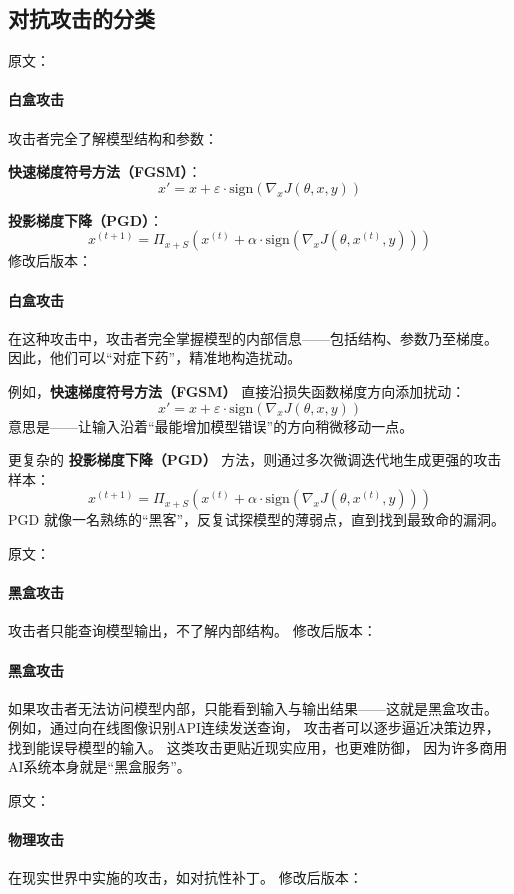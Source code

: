 \subsection{对抗攻击的分类}

原文：
\paragraph{白盒攻击}
攻击者完全了解模型结构和参数：

\textbf{快速梯度符号方法（FGSM）}：
$$x' = x + \varepsilon \cdot \text{sign}(\nabla_x J(\theta, x, y))$$

\textbf{投影梯度下降（PGD）}：
$$x^{(t+1)} = \Pi_{x+S}(x^{(t)} + \alpha \cdot \text{sign}(\nabla_x J(\theta, x^{(t)}, y)))$$
修改后版本：
\paragraph{白盒攻击}  
在这种攻击中，攻击者完全掌握模型的内部信息——包括结构、参数乃至梯度。  
因此，他们可以“对症下药”，精准地构造扰动。  

例如，\textbf{快速梯度符号方法（FGSM）} 直接沿损失函数梯度方向添加扰动：  
$$x' = x + \varepsilon \cdot \text{sign}(\nabla_x J(\theta, x, y))$$  
意思是——让输入沿着“最能增加模型错误”的方向稍微移动一点。  

更复杂的 \textbf{投影梯度下降（PGD）} 方法，则通过多次微调迭代地生成更强的攻击样本：  
$$x^{(t+1)} = \Pi_{x+S}(x^{(t)} + \alpha \cdot \text{sign}(\nabla_x J(\theta, x^{(t)}, y)))$$  
PGD 就像一名熟练的“黑客”，反复试探模型的薄弱点，直到找到最致命的漏洞。



原文：
\paragraph{黑盒攻击}
攻击者只能查询模型输出，不了解内部结构。
修改后版本：
\paragraph{黑盒攻击}  
如果攻击者无法访问模型内部，只能看到输入与输出结果——这就是黑盒攻击。  
例如，通过向在线图像识别API连续发送查询，  
攻击者可以逐步逼近决策边界，找到能误导模型的输入。  
这类攻击更贴近现实应用，也更难防御，  
因为许多商用AI系统本身就是“黑盒服务”。



原文：
\paragraph{物理攻击}
在现实世界中实施的攻击，如对抗性补丁。
修改后版本：
